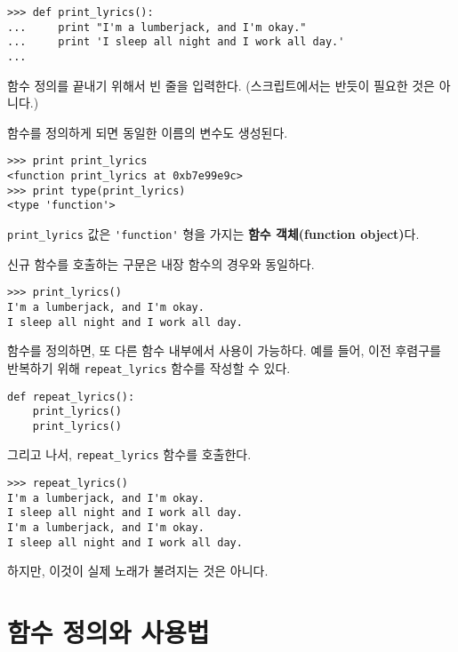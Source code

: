 \beforeverb
\begin{verbatim}
>>> def print_lyrics():
...     print "I'm a lumberjack, and I'm okay."
...     print 'I sleep all night and I work all day.'
...
\end{verbatim}
\afterverb
%

함수 정의를 끝내기 위해서 빈 줄을 입력한다. (스크립트에서는 반듯이 필요한 것은 아니다.) 

함수를 정의하게 되면 동일한 이름의 변수도 생성된다.

\beforeverb
\begin{verbatim}
>>> print print_lyrics
<function print_lyrics at 0xb7e99e9c>
>>> print type(print_lyrics)
<type 'function'>
\end{verbatim}
\afterverb
%

\verb"print_lyrics" 값은 \verb"'function'" 형을 가지는 {\bf 함수 객체(function object)}다. 


신규 함수를 호출하는 구문은 내장 함수의 경우와 동일하다.

\beforeverb
\begin{verbatim}
>>> print_lyrics()
I'm a lumberjack, and I'm okay.
I sleep all night and I work all day.
\end{verbatim}
\afterverb
%

함수를 정의하면, 또 다른 함수 내부에서 사용이 가능하다.
예를 들어, 이전 후렴구를 반복하기 위해 \verb"repeat_lyrics" 함수를 작성할 수 있다.

\beforeverb
\begin{verbatim}
def repeat_lyrics():
    print_lyrics()
    print_lyrics()
\end{verbatim}
\afterverb
%

그리고 나서, \verb"repeat_lyrics" 함수를 호출한다.

\beforeverb
\begin{verbatim}
>>> repeat_lyrics()
I'm a lumberjack, and I'm okay.
I sleep all night and I work all day.
I'm a lumberjack, and I'm okay.
I sleep all night and I work all day.
\end{verbatim}
\afterverb
%

하지만, 이것이 실제 노래가 불려지는 것은 아니다.

\section{함수 정의와 사용법}

